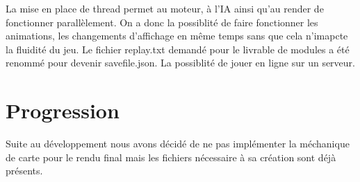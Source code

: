 La mise en place de thread permet au moteur, à l'IA ainsi qu'au render de fonctionner parallèlement. On a donc la possiblité de faire fonctionner les animations, les changements d'affichage en même temps sans que cela n'imapcte la fluidité du jeu.
Le fichier replay.txt demandé pour le livrable de modules a été renommé pour devenir savefile.json.
La possiblité de jouer en ligne sur un serveur.



\section{Progression}

Suite au développement nous avons décidé de ne pas implémenter la méchanique de carte pour le rendu final mais les fichiers nécessaire à sa création sont déjà présents.








